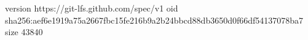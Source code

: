 version https://git-lfs.github.com/spec/v1
oid sha256:aef6e1919a75a2667fbc15fe216b9a2b24bbcd88db3650d0f66df54137078ba7
size 43840
